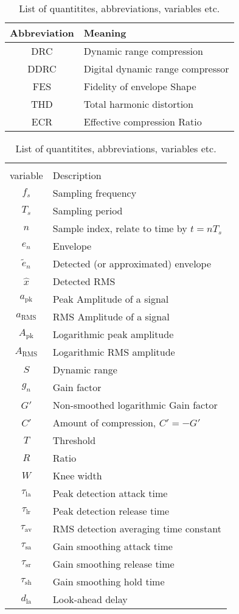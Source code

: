 \documentclass[../main2.tex]{subfiles}
\begin{document}
\begin{table}[h]
\begin{center}
\caption{List of quantitites, abbreviations, variables etc.}
\label{tab:list_of_quantities}
\begin{tabular}{| c | l |}
	\hline
	Abbreviation & Meaning \\ \hline
	DRC & Dynamic range compression \\
	DDRC & Digital dynamic range compressor \\
	FES & Fidelity of envelope Shape \\
	THD & Total harmonic distortion \\
	ECR & Effective compression Ratio \\
	\hline
\end{tabular}
\end{center}
\begin{center}
\begin{tabular}{| c | l |}
	\hline
	\tblbox{Quantity/\\variable} & Description \\ \hline
	$f_s$ & Sampling frequency \\
	$T_s$ & Sampling period \\
	$n$ & Sample index, relate to time by $t = nT_s$ \\
	$e_n$ & Envelope \\
	$\tilde{e}_n$ & Detected (or approximated) envelope\\
	$\hat{x}$ & Detected RMS \\
	$a_\text{pk}$ & Peak Amplitude of a signal \\
	$a_\text{RMS}$ & RMS Amplitude of a signal \\
	$A_\text{pk}$ & Logarithmic peak amplitude\\
	$A_\text{RMS}$ & Logarithmic RMS amplitude\\
	$S$ & Dynamic range\\
	$g_n$ & Gain factor\\
	$G'$ & Non-smoothed logarithmic Gain factor\\
	$C'$ & Amount of compression, $C' = -G'$ \\
	$T$ & Threshold\\
	$R$ & Ratio \\
	$W$ & Knee width \\
	$\tau_\text{la}$ & Peak detection attack time \\
	$\tau_\text{lr}$ & Peak detection release time \\
	$\tau_\text{av}$ & RMS detection averaging time constant\\
	$\tau_\text{sa}$ & Gain smoothing attack time \\
	$\tau_\text{sr}$ & Gain smoothing release time \\
	$\tau_\text{sh}$ & Gain smoothing hold time \\
	$d_\text{la}$ & Look-ahead delay \\
	\hline
\end{tabular}
\end{center}

\end{table}
\end{document}
